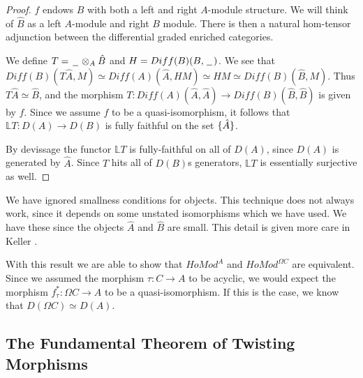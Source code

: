\documentclass[../thesis.tex]{subfiles}
\begin{document}
            \begin{proof}
                $f$ endows $B$ with both a left and right $A$-module structure. We will think of $\hat{B}$ as a left $A$-module and right $B$ module. There is then a natural hom-tensor adjunction between the differential graded enriched categories.

                \begin{center}
                \end{center}

                We define $T = \hspace{0.05cm}\underline{\hspace{0.2cm}}\hspace{0.05cm} \otimes_A \hat{B}$ and $H = Diff(B)(B,\hspace{0.05cm}\underline{\hspace{0.2cm}}\hspace{0.05cm})$. We see that $Diff(B)(T\hat{A}, M)\simeq Diff(A)(\hat{A}, HM)\simeq HM \simeq Diff(B)(\hat{B}, M)$. Thus $T\hat{A}\simeq \hat{B}$, and the morphism $T : Diff(A)(\hat{A}, \hat{A}) \rightarrow Diff(B)(\hat{B}, \hat{B})$ is given by $f$. Since we assume $f$ to be a quasi-isomorphism, it follows that $\mathbb{L}T : D(A) \rightarrow D(B)$ is fully faithful on the set $\{\hat{A}\}$.

                By devissage the functor $\mathbb{L}T$ is fully-faithful on all of $D(A)$, since $D(A)$ is generated by $\hat{A}$. Since $T$ hits all of $D(B)$s generators, $\mathbb{L}T$ is essentially surjective as well.
            \end{proof}

            \begin{remark}
                We have ignored smallness conditions for objects. This technique does not always work, since it depends on some unstated isomorphisms which we have used. We have these since the objects $\hat{A}$ and $\hat{B}$ are small. This detail is given more care in Keller \cite{Keller94}.
            \end{remark}
                
            With this result we are able to show that $HoMod^A$ and $HoMod^{\Omega C}$ are equivalent. Since we assumed the morphism $\tau: C \rightarrow A$ to be acyclic, we would expect the morphism $f_\tau^* : \Omega C \rightarrow A$ to be a quasi-isomorphism. If this is the case, we know that $D(\Omega C)\simeq D(A)$. 

        \subsection{The Fundamental Theorem of Twisting Morphisms}
\end{document}
